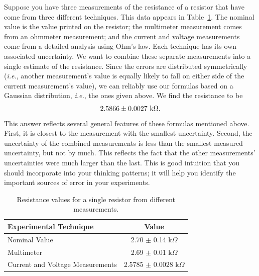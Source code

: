 Suppose you have three measurements of the resistance of a resistor that have 
come from three different techniques. This data appears in 
Table~\ref{tab:intro:resistance measurements}. The nominal value is the value 
printed on the resistor; the multimeter measurement comes from an ohmmeter 
measurement; and the current and voltage measurements come from a detailed 
analysis using Ohm's law. Each technique has its own associated uncertainty. 
We want to combine these separate measurements into a single estimate of the 
resistance. Since the errors are distributed symmetrically ({\it i.e.}, 
another measurement's value is equally likely to fall on either side of the 
current measurement's value), we can reliably use our formulas based on a 
Gaussian distribution, {\it i.e.}, the ones given above. We find the 
resistance to be
\begin{eqnarray*}
2.5866 \pm 0.0027~{\rm k} \Omega.
\end{eqnarray*}
This answer reflects several general features of these formulas mentioned 
above. First, it is closest to the measurement with the smallest uncertainty. 
Second, the uncertainty of  the combined measurements is less than the 
smallest measured uncertainty, but not by much. This reflects the fact that 
the other measurements' uncertainties were much larger than the last. This is 
good intuition that you should incorporate into your thinking patterns; it 
will help you identify the important sources of error in your experiments.
\begin{table}[htb]
\begin{center}
\begin{tabular}{l|c}
Experimental Technique & Value\\
\hline
Nominal Value & 2.70 $\pm$ 0.14 k$\Omega$\\
Multimeter        & 2.69 $\pm$ 0.01 k$\Omega$\\
Current and Voltage Measurements & 2.5785 $\pm$ 0.0028 k$\Omega$\\
\end{tabular}
\end{center}
\caption{Resistance values for a single resistor from different measurements.}
\label{tab:intro:resistance measurements}
\end{table}

